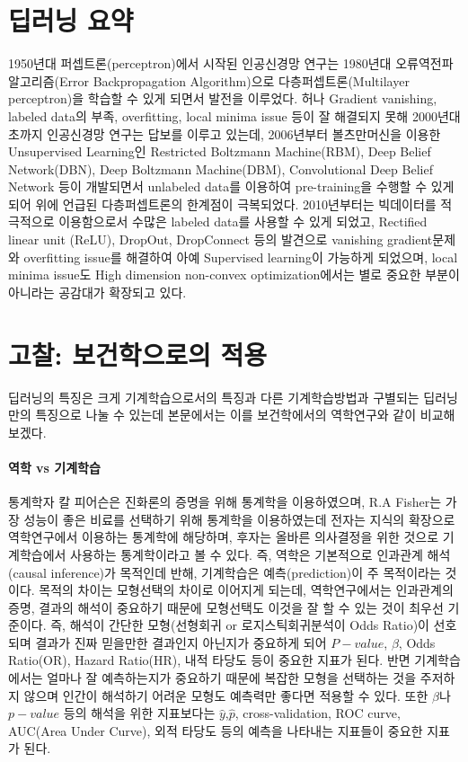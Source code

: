 \documentclass[10pt]{article}
\begin{document}
\section{딥러닝 요약}
1950년대 퍼셉트론(perceptron)에서 시작된 인공신경망 연구는 1980년대 오류역전파알고리즘(Error Backpropagation Algorithm)으로 다층퍼셉트론(Multilayer perceptron)을 학습할 수 있게 되면서 발전을 이루었다. 허나 Gradient vanishing, labeled data의 부족, overfitting, local minima issue 등이 잘 해결되지 못해 2000년대 초까지 인공신경망 연구는 답보를 이루고 있는데, 2006년부터 볼츠만머신을 이용한 Unsupervised Learning인 Restricted Boltzmann Machine(RBM), Deep Belief Network(DBN), Deep Boltzmann Machine(DBM), Convolutional Deep Belief Network 등이 개발되면서 unlabeled data를 이용하여 pre-training을 수행할 수 있게 되어 위에 언급된 다층퍼셉트론의 한계점이 극복되었다. 2010년부터는 빅데이터를 적극적으로 이용함으로서 수많은 labeled data를 사용할 수 있게 되었고, Rectified linear unit (ReLU), DropOut, DropConnect 등의 발견으로 vanishing gradient문제와 overfitting issue를 해결하여 아예 Supervised learning이 가능하게 되었으며, local minima issue도 High dimension non-convex optimization에서는 별로 중요한 부분이 아니라는 공감대가 확장되고 있다. 


\section{고찰: 보건학으로의 적용}
딥러닝의 특징은 크게 기계학습으로서의 특징과 다른 기계학습방법과 구별되는 딥러닝만의 특징으로 나눌 수 있는데 본문에서는 이를 보건학에서의 역학연구와 같이 비교해 보겠다.


\paragraph{역학 vs 기계학습}
통계학자 칼 피어슨은 진화론의 증명을 위해 통계학을 이용하였으며, R.A Fisher는 가장 성능이 좋은 비료를 선택하기 위해 통계학을 이용하였는데 전자는 지식의 확장으로 역학연구에서 이용하는 통계학에 해당하며, 후자는 올바른 의사결정을 위한 것으로 기계학습에서 사용하는 통계학이라고 볼 수 있다. 즉, 역학은 기본적으로 인과관계 해석(causal inference)가 목적인데 반해, 기계학습은 예측(prediction)이 주 목적이라는 것이다. 목적의 차이는 모형선택의 차이로 이어지게 되는데, 역학연구에서는 인과관계의 증명, 결과의 해석이 중요하기 때문에 모형선택도 이것을 잘 할 수 있는 것이 최우선 기준이다. 즉, 해석이 간단한 모형(선형회귀 or 로지스틱회귀분석이 Odds Ratio)이 선호되며 결과가 진짜 믿을만한 결과인지 아닌지가 중요하게 되어 $P-value$, $\beta$, Odds Ratio(OR), Hazard Ratio(HR), 내적 타당도 등이 중요한 지표가 된다. 반면 기계학습에서는 얼마나 잘 예측하는지가 중요하기 때문에 복잡한 모형을 선택하는 것을 주저하지 않으며 인간이 해석하기 어려운 모형도 예측력만 좋다면 적용할 수 있다. 또한 $\beta$나 $p-value$ 등의 해석을 위한 지표보다는 $\hat{y}$,$\hat{p}$, cross-validation, ROC curve, AUC(Area Under Curve), 외적 타당도 등의 예측을 나타내는 지표들이 중요한 지표가 된다. 
\end{document}
